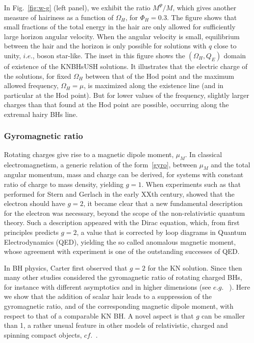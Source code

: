   
 In Fig.~\ref{fig:w-g} (left panel), we exhibit the ratio $ M^{\Psi}/M$, which gives another measure of hairiness
   as a function of $\Omega_H$,
for $\Phi_H=0.3$. The figure shows that small fractions of the total energy in the hair are only allowed for sufficiently large horizon angular velocity. When the angular velocity is small, equilibrium between the hair and the horizon is only possible for solutions with $q$ close to unity, $i.e.$, boson star-like. 
The inset in this figure shows the $(\Omega_H,Q_E)$ domain of existence of the KNBHsUSH solutions. It illustrates that the electric charge of the solutions, for fixed $\Omega_H$ between that of the Hod point and the maximum allowed frequency, $\Omega_H=\mu$, is maximized along the existence line (and in particular at the Hod point). But for lower values of the frequency, slightly larger charges than that found at the Hod point are possible, occurring along the extremal hairy BHs line.

 

 

\subsubsection{Gyromagnetic ratio}
Rotating charges give rise to a magnetic dipole moment, $\mu_M$. 
In classical electromagnetism, a generic relation of the form~\eqref{gyro}, 
between $\mu_M$ and the total angular momentum, mass and charge can be derived, 
for systems with constant ratio of charge to mass density, yielding $g=1$. 
When experiments such as that performed for Stern and Gerlach in the early XXth century, 
showed that the electron should have $g=2$, it became clear that a new fundamental description 
for the electron was necessary, beyond the scope of the non-relativistic quantum theory. 
Such a description appeared with the Dirac equation, which, from first principles predicts $g=2$, 
a value that is corrected by loop diagrams in Quantum Electrodynamics (QED), 
yielding the so called anomalous magnetic moment, whose agreement 
with experiment is one of the outstanding successes of QED.

In BH physics, Carter first observed that $g=2$ for the KN solution. 
Since then many other studies considered the gyromagnetic ratio of rotating charged BHs, 
for instance with different asymptotics and in higher dimensions (see $e.g.$~
\cite{Garfinkle:1990ib,Herdeiro:2000ap,Aliev:2004ec,Ortaggio:2006ng,Aliev:2006tt}). 
Here we show that the addition of scalar hair leads to a suppression of the gyromagnetic ratio, 
and of the corresponding magnetic dipole moment, 
with respect to that of a comparable KN BH.  
 A novel aspect is that $g$ 
can be smaller than 1, a rather unsual feature in other models of relativistic, 
charged and spinning compact objects, 
$cf.$~\cite{Novak:2003uj}. 


